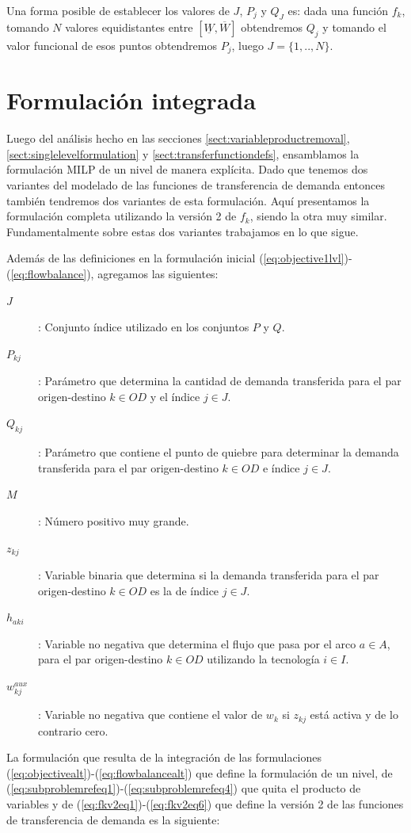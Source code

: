 Una forma posible de establecer los valores de $J$, $P_j$ y $Q_J$ es: dada una función $f_k$, tomando $N$ valores equidistantes entre $[\underline{W}, \overline{W}]$ obtendremos $Q_j$ y tomando el valor funcional de esos puntos obtendremos $P_j$, luego $J=\{1,..,N\}$.

\section{Formulación integrada}
\label{sect:alltogether}

Luego del análisis hecho en las secciones \ref{sect:variableproductremoval}, \ref{sect:singlelevelformulation} y \ref{sect:transferfunctiondefs}, ensamblamos la formulación MILP de un nivel de manera explícita. Dado que tenemos dos variantes del modelado de las funciones de transferencia de demanda entonces también tendremos dos variantes de esta formulación. Aquí presentamos la formulación completa utilizando la versión 2 de $f_k$, siendo la otra muy similar. Fundamentalmente sobre estas dos variantes trabajamos en lo que sigue.

Además de las definiciones en la formulación inicial (\ref{eq:objective1lvl})-(\ref{eq:flowbalance}), agregamos las siguientes:

\begin{description}
  \item[$J$]: Conjunto índice utilizado en los conjuntos $P$ y $Q$.
  \item[$P_{kj}$]: Parámetro que determina la cantidad de demanda transferida para el par origen-destino $k \in OD$ y el índice $j \in J$.
  \item[$Q_{kj}$]: Parámetro que contiene el punto de quiebre para determinar la demanda transferida para el par origen-destino $k \in OD$ e índice $j \in J$.
  \item[$M$]: Número positivo muy grande.
  \item[$z_{kj}$]: Variable binaria que determina si la demanda transferida para el par origen-destino $k \in OD$ es la de índice $j \in J$.
  \item[$h_{aki}$]: Variable no negativa que determina el flujo que pasa por el arco $a \in A$, para el par origen-destino $k \in OD$ utilizando la tecnología $i \in I$.
  \item[$w^{aux}_{kj}$]: Variable no negativa que contiene el valor de $w_{k}$ si $z_{kj}$ está activa y de lo contrario cero.
\end{description}

La formulación que resulta de la integración de las formulaciones (\ref{eq:objectivealt})-(\ref{eq:flowbalancealt}) que define la formulación de un nivel, de (\ref{eq:subproblemrefeq1})-(\ref{eq:subproblemrefeq4}) que quita el producto de variables y de (\ref{eq:fkv2eq1})-(\ref{eq:fkv2eq6}) que define la versión 2 de las funciones de transferencia de demanda es la siguiente:

